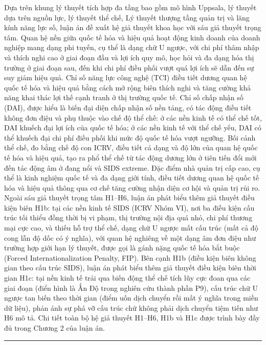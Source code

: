 \documentclass[
  a4paper,
  13pt]{extreport}
\begin{document}
Dựa trên khung lý thuyết tích hợp đa tầng bao gồm mô hình Uppsala, lý
thuyết dựa trên nguồn lực, lý thuyết thể chế, Lý thuyết thượng tầng quản
trị và lăng kính năng lực số, luận án đề xuất hệ giả thuyết khoa học với
sáu giả thuyết trọng tâm. Quan hệ nền giữa quốc tế hóa và hiệu quả hoạt
động kinh doanh của doanh nghiệp mang dạng phi tuyến, cụ thể là dạng chữ
U ngược, với chi phí thâm nhập và thích nghi cao ở giai đoạn đầu và lợi
ích quy mô, học hỏi và đa dạng hóa thị trường ở giai đoạn sau, đến khi
chi phí điều phối vượt quá lợi ích sẽ dẫn đến sự suy giảm hiệu quả. Chỉ
số năng lực công nghệ (TCI) điều tiết dương quan hệ quốc tế hóa và hiệu
quả bằng cách mở rộng biên thích nghi và tăng cường khả năng khai thác
lợi thế cạnh tranh ở thị trường quốc tế. Chỉ số chấp nhận số (DAI), được
hiểu là biến đại diện chấp nhận số nền tảng, có tác động điều tiết không
đơn điệu và phụ thuộc vào chế độ thể chế: ở các nền kinh tế có thể chế
tốt, DAI khuếch đại lợi ích của quốc tế hóa; ở các nền kinh tế với thể
chế yếu, DAI có thể khuếch đại chi phí điều phối khi mức độ quốc tế hóa
vượt ngưỡng. Bối cảnh thể chế, đo bằng chế độ con ICRV, điều tiết cả
dạng và độ lớn của quan hệ quốc tế hóa và hiệu quả, tạo ra phổ thể chế
từ tác động dương lớn ở tiên tiến đổi mới đến tác động âm ở đang nổi và
SIDS extreme. Đặc điểm nhà quản trị cấp cao, cụ thể là kinh nghiệm quốc
tế và đa dạng giới tính, điều tiết dương quan hệ quốc tế hóa và hiệu quả
thông qua cơ chế tăng cường nhận diện cơ hội và quản trị rủi ro. Ngoài
sáu giả thuyết trọng tâm H1--H6, luận án phát biểu thêm giả thuyết điều
kiện biên H1b: tại các nền kinh tế SIDS (ICRV Nhóm VI), nơi ba điều kiện
cấu trúc tối thiểu đồng thời bị vi phạm, thị trường nội địa quá nhỏ, chi
phí thương mại cực cao, và thiếu hỗ trợ thể chế, dạng chữ U ngược mất
cấu trúc (mất cả độ cong lẫn độ dốc có ý nghĩa), với quan hệ nghiêng về
một dạng âm đơn điệu như trường hợp giới hạn lý thuyết, được gọi là gánh
nặng quốc tế hóa bắt buộc (Forced Internationalization Penalty, FIP).
Bên cạnh H1b (điều kiện biên không gian theo cấu trúc SIDS), luận án
phát biểu thêm giả thuyết điều kiện biên thời gian H1c: tại nền kinh tế
trải qua biến động thể chế tích lũy cực đoan qua các giai đoạn (điển
hình là Ấn Độ trong nghiên cứu thành phần P9), cấu trúc chữ U ngược tan
biến theo thời gian (điểm uốn dịch chuyển rồi mất ý nghĩa trong miền dữ
liệu), phản ánh sự phá vỡ cấu trúc chứ không phải dịch chuyển tiệm tiến
như H6 mô tả. Chi tiết toàn bộ hệ giả thuyết H1--H6, H1b và H1c được
trình bày đầy đủ trong Chương 2 của luận án.

\begin{center}\rule{0.5\linewidth}{0.5pt}\end{center}
\end{document}
